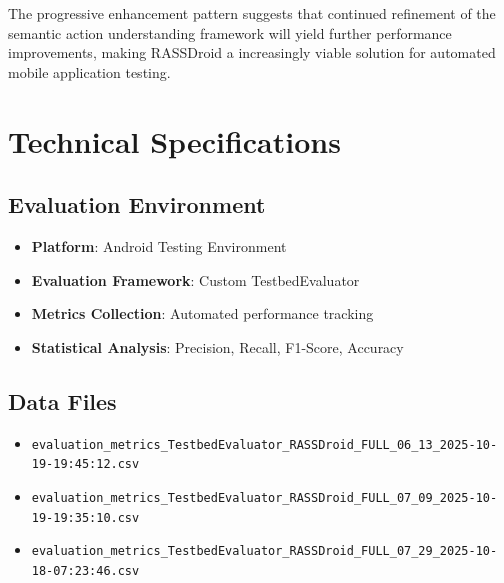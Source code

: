 \documentclass[11pt]{article}
\begin{document}
The progressive enhancement pattern suggests that continued refinement of the semantic action understanding framework will yield further performance improvements, making RASSDroid a increasingly viable solution for automated mobile application testing.

\appendix
\section{Technical Specifications}

\subsection{Evaluation Environment}
\begin{itemize}
    \item \textbf{Platform}: Android Testing Environment
    \item \textbf{Evaluation Framework}: Custom TestbedEvaluator
    \item \textbf{Metrics Collection}: Automated performance tracking
    \item \textbf{Statistical Analysis}: Precision, Recall, F1-Score, Accuracy
\end{itemize}

\subsection{Data Files}
\begin{itemize}
    \item \texttt{evaluation\_metrics\_TestbedEvaluator\_RASSDroid\_FULL\_06\_13\_2025-10-19-19:45:12.csv}
    \item \texttt{evaluation\_metrics\_TestbedEvaluator\_RASSDroid\_FULL\_07\_09\_2025-10-19-19:35:10.csv}
    \item \texttt{evaluation\_metrics\_TestbedEvaluator\_RASSDroid\_FULL\_07\_29\_2025-10-18-07:23:46.csv}
\end{itemize}
\end{document}
